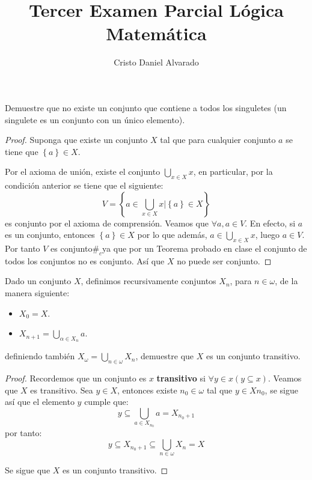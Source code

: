 \documentclass[12pt]{article}
\newcounter{it}
\theoremstyle{largebreak}
\newcommand\contradiction{\ensuremath{\#_c}}
\begin{document}
    \setlength{\parskip}{5pt} %
    \setlength{\parindent}{12pt} %
    \title{Tercer Examen Parcial Lógica Matemática}
    \author{Cristo Daniel Alvarado}
    \maketitle

    \begin{excer}
        Demuestre que no existe un conjunto que contiene a todos los singuletes (un singulete es un conjunto con un único elemento).
    \end{excer}

    \begin{proof}
        Suponga que existe un conjunto $X$ tal que para cualquier conjunto $a$ se tiene que $\left\{a\right\}\in X$.

        Por el axioma de unión, existe el conjunto $\bigcup_{ x\in X}x$, en particular, por la condición anterior se tiene que el siguiente:
        \begin{equation*}
            V=\left\{a\in\bigcup_{ x\in X}x\Big|\left\{a\right\}\in X  \right\}
        \end{equation*}
        es conjunto por el axioma de comprensión. Veamos que $\forall a, a\in V$. En efecto, si $a$ es un conjunto, entonces $\left\{a\right\}\in X$ por lo que además, $a\in\bigcup_{ x\in X}x$, luego $a\in V$. Por tanto $V$ es conjunto\contradiction ya que por un Teorema probado en clase el conjunto de todos los conjuntos no es conjunto. Así que $X$ no puede ser conjunto. 
    \end{proof}
    
    \begin{excer}
        Dado un conjunto $X$, definimos recursivamente conjuntos $X_n$, para $n\in\omega$, de la manera siguiente:
        \begin{itemize}
            \item $X_0=X$.
            \item $X_{ n+1}=\bigcup_{\alpha\in X_n}a$.
        \end{itemize}
        definiendo también $X_{\omega}=\bigcup_{ n\in\omega}X_n$, demuestre que $X$ es un conjunto transitivo.
    \end{excer}

    \begin{proof}
        Recordemos que un conjunto es $x$ \textbf{transitivo} si $\forall y\in x(y\subseteq x)$. Veamos que $X$ es transitivo. Sea $y\in X$, entonces existe $n_0\in\omega$ tal que $y\in X{n_0}$, se sigue así que el elemento $y$ cumple que:
        \begin{equation*}
            y\subseteq\bigcup_{ a\in X_{n_0}}a=X_{n_0+1}
        \end{equation*}
        por tanto:
        \begin{equation*}
            y\subseteq X_{ n_0+1}\subseteq\bigcup_{ n\in\omega}X_n=X
        \end{equation*}
        
        Se sigue que $X$ es un conjunto transitivo.
    \end{proof}
\end{document}
